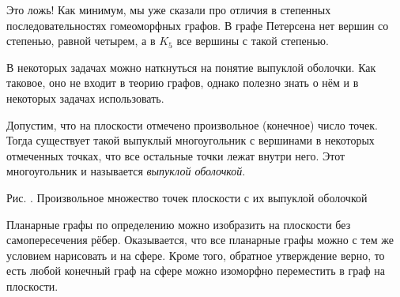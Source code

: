 	Это ложь! Как минимум, мы уже сказали про отличия в степенных последовательностях гомеоморфных графов. 
	В графе Петерсена нет вершин со степенью, равной четырем, а в $K_5$ все вершины с такой степенью.
	

	В некоторых задачах можно наткнуться на понятие выпуклой оболочки. Как таковое, оно не входит в теорию графов, 
	однако полезно знать о нём и в некоторых задачах использовать.
	
	Допустим, что на плоскости отмечено произвольное (конечное) число точек. Тогда существует такой выпуклый многоугольник 
	с вершинами в некоторых отмеченных точках, что все остальные точки лежат внутри него. Этот многоугольник и называется \emph{выпуклой оболочкой}.
	
\begin{center}\end{center}
\begin{center}
	\small Рис. \images. Произвольное множество точек плоскости с их выпуклой оболочкой
\end{center}

	Планарные графы по определению можно изобразить на плоскости без самопересечения рёбер. Оказывается, что 
	все планарные графы можно с тем же условием нарисовать и на сфере. Кроме того, обратное утверждение верно, 
	то есть любой конечный граф на сфере можно изоморфно переместить в граф на плоскости.

